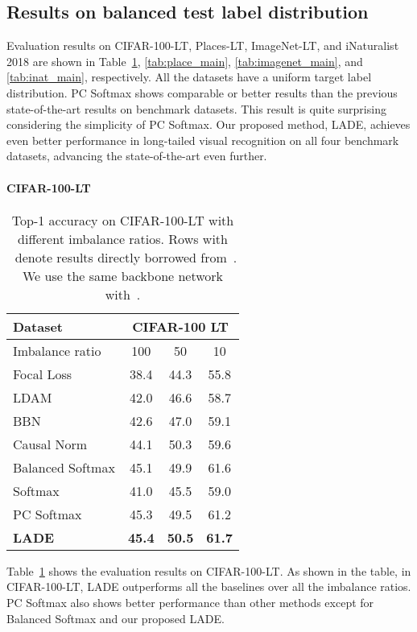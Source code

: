 \documentclass[final]{cvpr}
\begin{document}
\subsection{Results on balanced test label distribution}
\label{subsec:4_2_results_on_balanced_test_label_distribution}
Evaluation results on CIFAR-100-LT, Places-LT, ImageNet-LT, and iNaturalist 2018 are shown in Table~\ref{tab:cifar_main}, \ref{tab:place_main}, \ref{tab:imagenet_main}, and \ref{tab:inat_main}, respectively.
All the datasets have a uniform target label distribution.
PC Softmax shows comparable or better results than the previous state-of-the-art results on benchmark datasets.
This result is quite surprising considering the simplicity of PC Softmax.
Our proposed method, LADE, achieves even better performance in long-tailed visual recognition on all four benchmark datasets, advancing the state-of-the-art even further.

\paragraph{CIFAR-100-LT}
\begin{table}[t]
\footnotesize
\centering
\caption{Top-1 accuracy on CIFAR-100-LT with different imbalance ratios. Rows with ~denote results directly borrowed from~\cite{tang2020long}. We use the same backbone network with~\cite{tang2020long}.}
\vspace{0pt}
{
\begin{tabular}{l  c  c  c}
\toprule
Dataset & \multicolumn{3}{c}{CIFAR-100 LT} \\ 
\midrule
Imbalance ratio & 100 & 50 & 10 \\
\midrule
Focal Loss & 38.4 & 44.3 & 55.8 \\
LDAM & 42.0 & 46.6 & 58.7 \\
BBN & 42.6 & 47.0 & 59.1 \\
Causal Norm & 44.1 & 50.3 & 59.6 \\
Balanced Softmax & 45.1 & 49.9 & 61.6 \\
Softmax & 41.0 & 45.5 & 59.0 \\
\midrule
PC Softmax & 45.3 & 49.5 & 61.2 \\
\textbf{LADE} & \textbf{45.4} & \textbf{50.5} & \textbf{61.7} \\
\bottomrule
\end{tabular}
}
\label{tab:cifar_main}
\vspace{0mm}
\end{table} Table~\ref{tab:cifar_main} shows the evaluation results on CIFAR-100-LT.
As shown in the table, in CIFAR-100-LT, LADE outperforms all the baselines over all the imbalance ratios.
PC Softmax also shows better performance than other methods except for Balanced Softmax and our proposed LADE.
\end{document}
